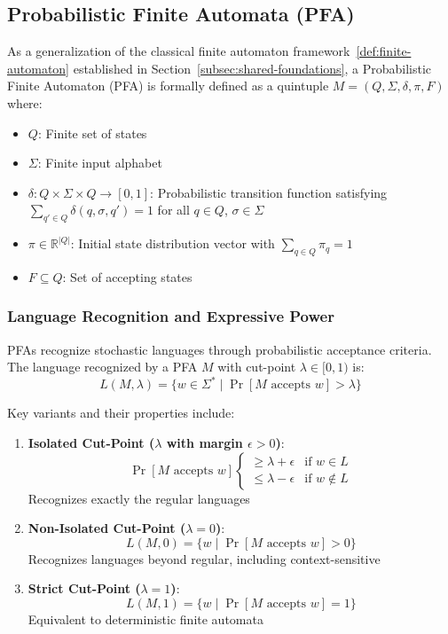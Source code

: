 \subsection{Probabilistic Finite Automata (PFA)}
\label{subsec:pfa}

As a generalization of the classical finite automaton framework~\ref{def:finite-automaton} established in Section~\ref{subsec:shared-foundations}, a Probabilistic Finite Automaton (PFA)\cite{rabin1963probabilistic} is formally defined as a quintuple \( M = (Q, \Sigma, \delta, \pi, F) \) where:
\begin{itemize}
    \item \( Q \): Finite set of states
    \item \( \Sigma \): Finite input alphabet
    \item \( \delta: Q \times \Sigma \times Q \rightarrow [0,1] \): Probabilistic transition function satisfying \( \sum_{q' \in Q} \delta(q, \sigma, q') = 1 \) for all \( q \in Q \), \( \sigma \in \Sigma \)
    \item \( \pi \in \mathbb{R}^{|Q|} \): Initial state distribution vector with \( \sum_{q \in Q} \pi_q = 1 \)
    \item \( F \subseteq Q \): Set of accepting states
\end{itemize}

\subsubsection{Language Recognition and Expressive Power}
PFAs recognize stochastic languages through probabilistic acceptance criteria. The language recognized by a PFA \( M \) with cut-point \( \lambda \in [0,1) \) is:
\[ L(M, \lambda) = \{ w \in \Sigma^* \mid \Pr[M \text{ accepts } w] > \lambda \} \]

Key variants and their properties include:

\begin{enumerate}
    \item \textbf{Isolated Cut-Point (\( \lambda \) with margin \( \epsilon > 0 \))}:
    \[ \Pr[M \text{ accepts } w] \begin{cases} 
    \geq \lambda + \epsilon & \text{if } w \in L \\
    \leq \lambda - \epsilon & \text{if } w \notin L 
    \end{cases} \]
    Recognizes exactly the regular languages \cite{rabin1963probabilistic}
    
    \item \textbf{Non-Isolated Cut-Point (\( \lambda = 0 \))}:
    \[ L(M, 0) = \{ w \mid \Pr[M \text{ accepts } w] > 0 \} \]
    Recognizes languages beyond regular, including context-sensitive \cite{paz1971introduction}
    
    \item \textbf{Strict Cut-Point (\( \lambda = 1 \))}:
    \[ L(M, 1) = \{ w \mid \Pr[M \text{ accepts } w] = 1 \} \]
    Equivalent to deterministic finite automata \cite{salomaa1969probabilistic}
\end{enumerate}

